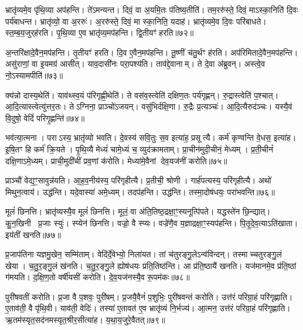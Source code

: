 भ्रातृ॑व्यमे॒व पृ॑थि॒व्या अप॑हन्ति।
ते॑ऽमन्यन्त।
दिवं॒ वा अ॒यमि॒तः प॑तिष्य॒तीति॑।
तम॒ररु॑स्ते॒ दिवं॒ माऽस्का॒निति॑ दि॒वः पर्य॑बाधन्त।
भ्रातृ॑व्यो॒ वा अ॒ररुः॑।
अ॒ररु॑स्ते॒ दिवं॒ मा स्का॒निति॒ यदाह॑।
भ्रातृ॑व्यमे॒व दि॒वः परि॑बाधते।
स्त॒म्ब॒य॒जुर्‌\mbox{}ह॑रति।
पृ॒थि॒व्या ए॒व भ्रातृ॑व्य॒मप॑हन्ति।
द्वि॒तीयꣳ॑ हरति॥७२॥

अ॒न्तरि॑क्षादे॒वैन॒मप॑हन्ति।
तृ॒तीयꣳ॑ हरति।
दि॒व ए॒वैन॒मप॑हन्ति।
तू॒ष्णीं च॑तु॒र्थꣳ ह॑रति।
अप॑रिमितादे॒वैन॒मप॑हन्ति।
असु॑राणां॒ वा इ॒यमग्र॑ आसीत्।
याव॒दासी॑नः परा॒पश्य॑ति।
ताव॑द्दे॒वानाम्।
ते दे॒वा अ॑ब्रुवन्।
अस्त्वे॒व नो॒\-ऽस्यामपीति॑॥७३॥

क्य॑न्नो दास्य॒थेति॑।
याव॑थ्स्व॒यं प॑रिगृह्णी॒थेति॑।
ते वस॑व॒स्त्वेति॑ दक्षिण॒तः पर्य॑गृह्णन्।
रु॒द्रास्त्वेति॑ प॒श्चात्।
आ॒दि॒त्यास्त्वेत्यु॑त्तर॒तः।
तेऽग्निना॒ प्राञ्चो॑\-ऽजयन्।
वसु॑भिर्दक्षि॒णा।
रु॒द्रैः प्र॒त्यञ्चः॑।
आ॒दि॒त्यैरुद॑ञ्चः।
यस्यै॒वं वि॒दुषो॒ वेदिं॑ परिगृ॒ह्णन्ति॑॥७४॥

भव॑त्या॒त्मना।
पराऽस्य॒ भ्रातृ॑व्यो भवति।
दे॒वस्य॑ सवि॒तुः स॒व इत्या॑ह॒ प्रसूत्यै।
कर्म॑ कृण्वन्ति वे॒धस॒ इत्या॑ह।
इ॒षि॒तꣳ हि कर्म॑ क्रि॒यते।
पृ॒थि॒व्यै मेध्यं॑ चामे॒ध्यं च॒ व्युद॑क्रामताम्।
प्रा॒चीन॑मुदी॒चीनं॒ मेध्यम्।
प्र॒ती॒चीनं॑ दक्षि॒णा\-ऽमे॒ध्यम्।
प्राची॒मुदी॑चीं प्रव॒णां क॑रोति।
मेध्या॑मे॒वैनां देव॒यज॑नीं करोति॥७५॥

प्राञ्चौ॑ वेद्य॒ꣳ॒सावुन्न॑यति।
आ॒ह॒व॒नीय॑स्य॒ परि॑गृहीत्यै।
प्र॒तीची॒ श्रोणी।
गार्ह॑पत्यस्य॒ परि॑गृहीत्यै।
अथो॑ मिथुन॒त्वाय॑।
उद्ध॑न्ति।
यदे॒वास्या॑ अमे॒ध्यम्।
तदप॑हन्ति।
उद्ध॑न्ति।
तस्मा॒दोष॑धयः॒ परा॑भवन्ति॥७६॥

मूलं॑ छिनत्ति।
भ्रातृ॑व्यस्यै॒व मूलं॑ छिनत्ति।
मूलं॒ वा अ॑ति॒तिष्ठ॒द्रक्षा॒ꣳ॒स्यनूत्पि॑पते।
यद्धस्ते॑न छि॒न्द्यात्।
कु॒न॒खिनी प्र॒जाः स्युः॑।
स्प्येन॑ छिनत्ति।
वज्रो॒ वै स्प्यः।
वज्रे॑णै॒व य॒ज्ञाद्रक्षा॒ꣳ॒स्यप॑हन्ति।
पि॒तृ॒दे॒व॒त्या\-ऽति॑खाता।
इय॑तीं खनति॥७७॥

प्र॒जाप॑तिना यज्ञमु॒खेन॒ सम्मि॑ताम्।
वेदि॑र्दे॒वेभ्यो॒ निला॑यत।
तां च॑तुरङ्गु॒ले\-ऽन्व॑विन्दन्।
तस्माच्चतुरङ्गु॒लं खेया।
च॒तु॒र॒ङ्गु॒लं ख॑नति।
च॒तु॒र॒ङ्गु॒ले ह्योष॑धयः प्रति॒तिष्ठ॑न्ति।
आ प्र॑ति॒ष्ठायै॑ खनति।
यज॑मानमे॒व प्र॑ति॒ष्ठां ग॑मयति।
द॒क्षि॒ण॒तो वर्\mbox{}षी॑यसीं करोति।
दे॒व॒यज॑नस्यै॒व रू॒पम॑कः॥७८॥

पुरी॑षवतीं करोति।
प्र॒जा वै प॒शवः॒ पुरी॑षम्।
प्र॒जयै॒वैनं॑ प॒शुभिः॒ पुरी॑षवन्तं करोति।
उत्त॑रं परिग्रा॒हं परि॑गृह्णाति।
ए॒ताव॑ती॒ वै पृ॑थि॒वी।
याव॑ती॒ वेदिः॑।
तस्या॑ ए॒तावत॑ ए॒व भ्रातृ॑व्यं नि॒र्भज्य॑।
आ॒त्मन॒ उत्त॑रं परिग्रा॒हं परि॑गृह्णाति।
ऋ॒तम॑स्यृत॒सद॑नमस्यृत॒श्रीर॒सीत्या॑ह।
य॒था॒य॒जुरे॒वैतत्॥७९॥


